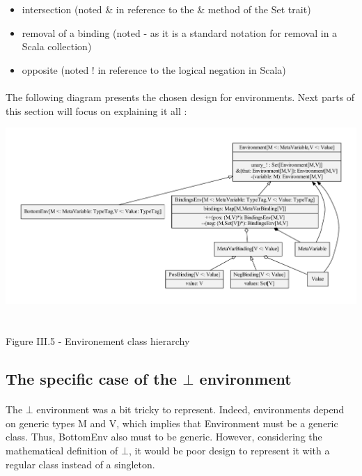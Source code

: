 \documentclass{report}
\begin{document}
\vspace{1.5mm}
\begin{itemize}
\item intersection (noted \& in reference to the \& method of the Set trait)\vspace{1mm}
\item removal of a binding (noted - as it is a standard notation for removal in a Scala collection)\vspace{1mm}
\item opposite (noted ! in reference to the logical negation in Scala)\vspace{1mm}
\end{itemize}

\paragraph{}
\hspace{4mm}The following diagram presents the chosen design for environments. Next parts of this section will focus on explaining it all :

\begin{center}
\includegraphics[scale=0.5]{data/Env}
~\\~\\Figure III.5 - Environement class hierarchy
\end{center}

\subsection* {The specific case of the $\bot$ environment}
\paragraph{}
\hspace{4mm}The $\bot$ environment was a bit tricky to represent. Indeed, environments depend on generic types
M and V, which implies that Environment must be a generic class. Thus, BottomEnv also must to be generic. However, 
considering the mathematical definition of $\bot$, it would be poor design to represent it with a regular class instead of a singleton.
\end{document}
